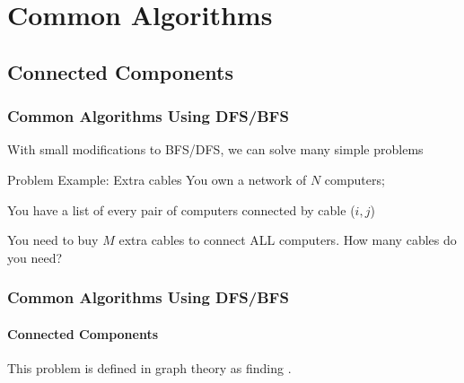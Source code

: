 \documentclass{beamer}
\begin{document}
\section{Common Algorithms}
\subsection{Connected Components}
\begin{frame}[fragile]
  \frametitle{Common Algorithms Using DFS/BFS}
  {\smaller
    \begin{exampleblock}{}
      With small modifications to BFS/DFS, we can solve many simple problems
    \end{exampleblock}

    \vfill
    
    \begin{block}{Problem Example: Extra cables}
      You own a network of $N$ computers;

      \bigskip

      You have a list of every pair of computers connected by cable ($i,j$)

      \bigskip

      You need to buy $M$ extra cables to connect ALL computers. How
      many cables do you need?      
    \end{block}
  }
\end{frame}

\begin{frame}
  \frametitle{Common Algorithms Using DFS/BFS}
  \framesubtitle{Connected Components}

  This problem is defined in graph theory as finding
  .
  
  \begin{center}
  \end{center}
\end{frame}
\end{document}
